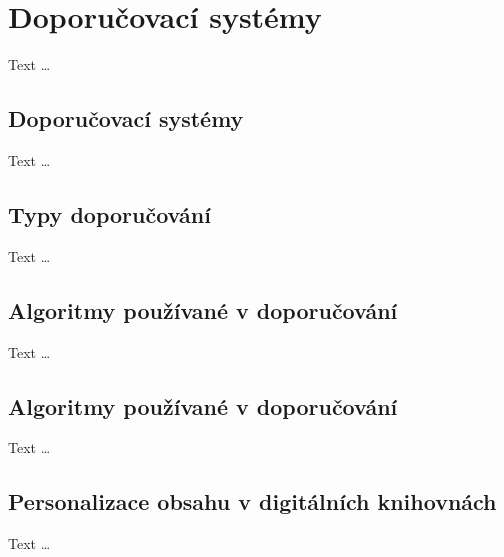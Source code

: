 
\section{Doporučovací systémy}
Text \dots


\subsection{Doporučovací systémy}
Text \dots


\subsection{Typy doporučování}
Text \dots


\subsection{Algoritmy používané v doporučování}
Text \dots


\subsection{Algoritmy používané v doporučování}
Text \dots


\subsection{Personalizace obsahu v digitálních knihovnách}
Text \dots


